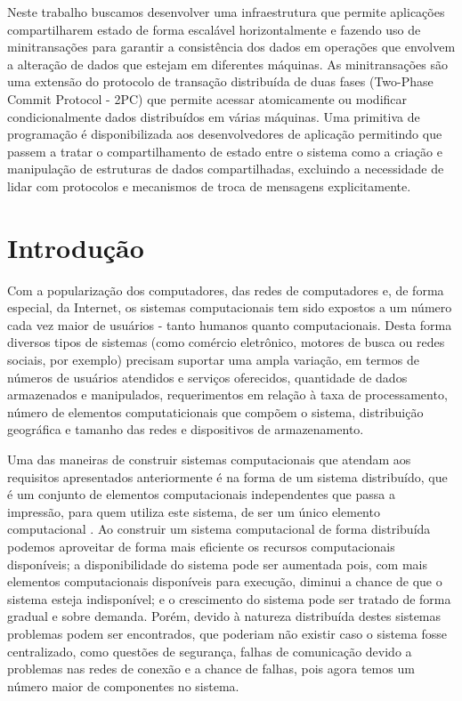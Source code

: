 \documentclass[a4paper,12pt]{report}
\begin{document}
Neste trabalho buscamos desenvolver uma infraestrutura que permite aplicações compartilharem estado de forma escalável horizontalmente e fazendo uso de minitransações para garantir a consistência dos dados em operações que envolvem a alteração de dados que estejam em diferentes máquinas. As minitransações são uma extensão do protocolo de transação distribuída de duas fases (Two-Phase Commit Protocol - 2PC) que permite acessar atomicamente ou modificar condicionalmente dados distribuídos em várias máquinas. Uma primitiva de programação é disponibilizada aos desenvolvedores de aplicação permitindo que passem a tratar o compartilhamento de estado entre o sistema como a criação e manipulação de estruturas de dados compartilhadas, excluindo a necessidade de lidar com protocolos e mecanismos de troca de mensagens explicitamente.
\tableofcontents
\listoftables
\listoffigures

\chapter{Introdução}
Com a popularização dos computadores, das redes de computadores e, de forma especial, da Internet, os sistemas computacionais tem sido expostos a um número cada vez maior de usuários - tanto humanos quanto computacionais. Desta forma diversos tipos de sistemas (como comércio eletrônico, motores de busca ou redes sociais, por exemplo) precisam suportar uma ampla variação, em termos de números de usuários atendidos e serviços oferecidos, quantidade de dados armazenados e manipulados, requerimentos em relação à taxa de processamento, número de elementos computaticionais que compõem o sistema, distribuição geográfica e tamanho das redes e dispositivos de armazenamento. 

Uma das maneiras de construir sistemas computacionais que atendam aos requisitos apresentados anteriormente é na forma de um sistema distribuído, que é um conjunto de elementos computacionais independentes que passa a impressão, para quem utiliza este sistema, de ser um único elemento computacional \cite{ds-tanenbaum}. Ao construir um sistema computacional de forma distribuída podemos aproveitar de forma mais eficiente os recursos computacionais disponíveis; a disponibilidade do sistema pode ser aumentada pois, com mais elementos computacionais disponíveis para execução, diminui a chance de que o sistema esteja indisponível; e o crescimento do sistema pode ser tratado de forma gradual e sobre demanda. Porém, devido à natureza distribuída destes sistemas problemas podem ser encontrados, que poderiam não existir caso o sistema fosse centralizado, como questões de segurança, falhas de comunicação devido a problemas nas redes de conexão e a chance de falhas, pois agora temos um número maior de componentes no sistema.
\end{document}
